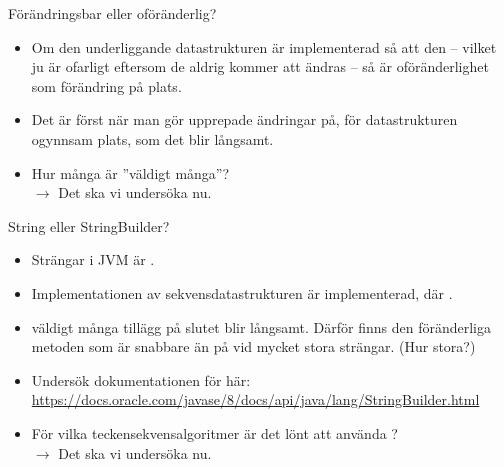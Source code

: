 \begin{Slide}{Förändringsbar eller oföränderlig?}
\begin{itemize}
\item Om den underliggande  datastrukturen är  implementerad så att den  -- vilket ju är ofarligt eftersom de aldrig kommer att ändras -- så är oföränderlighet  som förändring på plats.

\item Det är först när man gör  upprepade ändringar på, för datastrukturen ogynnsam plats, som det blir långsamt.

\item Hur många är ''väldigt många''?  \\ \pause $\rightarrow$ Det ska vi undersöka nu.

\end{itemize}
\end{Slide}

\begin{Slide}{String eller StringBuilder?}
\begin{itemize}
\item Strängar i JVM är .

\item Implementationen av sekvensdatastrukturen  är  implementerad, där .

\item {} väldigt många tillägg på slutet blir långsamt. Därför finns den föränderliga  metoden  som är snabbare än \code{+} på  vid mycket stora strängar. (Hur stora?)

\pause
\item Undersök dokumentationen för  här:
{\SlideFontTiny\url{https://docs.oracle.com/javase/8/docs/api/java/lang/StringBuilder.html}}

\pause
\item För vilka teckensekvensalgoritmer är det lönt att använda ? \\
\pause $\rightarrow$ Det ska vi undersöka nu.

\end{itemize}
\end{Slide}

